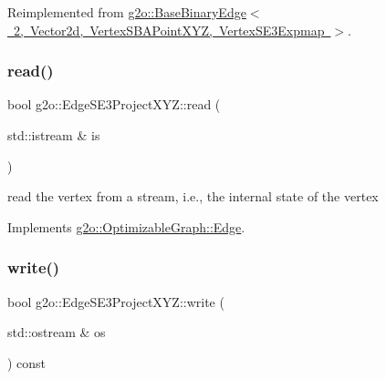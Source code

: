 Reimplemented from \mbox{\hyperlink{classg2o_1_1_base_binary_edge_af0fb8a693c8c7996fa65566e7263fbc4}{g2o\+::\+Base\+Binary\+Edge$<$ 2, Vector2d, Vertex\+S\+B\+A\+Point\+X\+Y\+Z, Vertex\+S\+E3\+Expmap $>$}}.

\mbox{\label{classg2o_1_1_edge_s_e3_project_x_y_z_a04200f3d6b7fbd47961df696f1ee34ed}} 
\subsubsection{\texorpdfstring{read()}{read()}}
{\footnotesize\ttfamily bool g2o\+::\+Edge\+S\+E3\+Project\+X\+Y\+Z\+::read (\begin{DoxyParamCaption}\item[{std\+::istream \&}]{is }\end{DoxyParamCaption})\hspace{0.3cm}{\ttfamily [virtual]}}



read the vertex from a stream, i.\+e., the internal state of the vertex 



Implements \mbox{\hyperlink{classg2o_1_1_optimizable_graph_1_1_edge_a30cf69b762a06aa35e796d8af71632b0}{g2o\+::\+Optimizable\+Graph\+::\+Edge}}.

\mbox{\label{classg2o_1_1_edge_s_e3_project_x_y_z_ad2c5fe36901961700eaa9f38cc4b21ca}} 
\subsubsection{\texorpdfstring{write()}{write()}}
{\footnotesize\ttfamily bool g2o\+::\+Edge\+S\+E3\+Project\+X\+Y\+Z\+::write (\begin{DoxyParamCaption}\item[{std\+::ostream \&}]{os }\end{DoxyParamCaption}) const\hspace{0.3cm}{\ttfamily [virtual]}}




